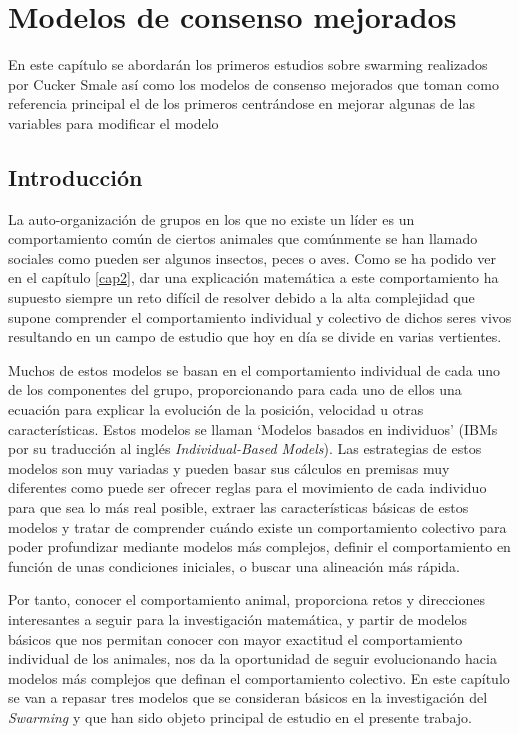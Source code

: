 \chapter{Modelos de consenso mejorados} \label{cap3}

En este capítulo se abordarán los primeros estudios sobre swarming realizados por Cucker Smale así como los modelos de consenso mejorados que toman como referencia principal el de los primeros centrándose en mejorar algunas de las variables para modificar el modelo

\section{Introducción}\label{s3_1}
La auto-organización de grupos en los que no existe un líder es un comportamiento común de ciertos animales que comúnmente se han llamado sociales como pueden ser algunos insectos, peces o aves. Como se ha podido ver en el capítulo \ref{cap2}, dar una explicación matemática a este comportamiento ha supuesto siempre un reto difícil de resolver debido a la alta complejidad que supone comprender el comportamiento individual y colectivo de dichos seres vivos resultando en un campo de estudio que hoy en día se divide en varias vertientes.

Muchos de estos modelos se basan en el comportamiento individual de cada uno de los componentes del grupo, proporcionando para cada uno de ellos una ecuación para explicar la evolución de la posición, velocidad u otras características. Estos modelos se llaman `Modelos basados en individuos' (IBMs por su traducción al inglés \textit{Individual-Based Models}). Las estrategias de estos modelos son muy variadas y pueden basar sus cálculos en premisas muy diferentes como puede ser ofrecer reglas para el movimiento de cada individuo para que sea lo más real posible, extraer las características básicas de estos modelos y tratar de comprender cuándo existe un comportamiento colectivo para poder profundizar mediante modelos más complejos, definir el comportamiento en función de unas condiciones iniciales, o buscar una alineación más rápida. 

Por tanto, conocer el comportamiento animal, proporciona retos y direcciones interesantes a seguir para la investigación matemática, y partir de modelos básicos que nos permitan conocer con mayor exactitud el comportamiento individual de los animales, nos da la oportunidad de seguir evolucionando hacia modelos más complejos que definan el comportamiento colectivo. En este capítulo se van a repasar tres modelos que se consideran básicos en la investigación del \textit{Swarming} y que han sido objeto principal de estudio en el presente trabajo.


